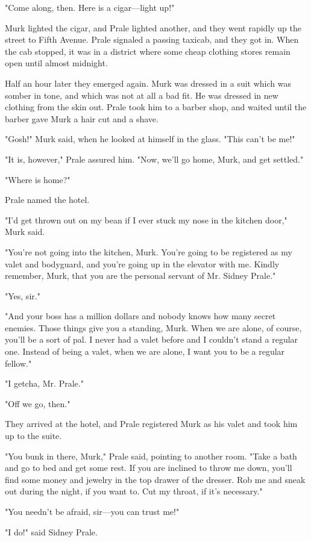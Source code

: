 \documentclass{novel}
\begin{document}
"Come along, then. Here is a cigar---light up!"

Murk lighted the cigar, and Prale lighted another, and they went rapidly up the street to Fifth Avenue. Prale signaled a passing taxicab, and they got in. When the cab stopped, it was in a district where some cheap clothing stores remain open until almost midnight.

Half an hour later they emerged again. Murk was dressed in a suit which was somber in tone, and which was not at all a bad fit. He was dressed in new clothing from the skin out. Prale took him to a barber shop, and waited until the barber gave Murk a hair cut and a shave.

"Gosh!" Murk said, when he looked at himself in the glass. "This can't be me!"

"It is, however," Prale assured him. "Now, we'll go home, Murk, and get settled."

"Where is home?"

Prale named the hotel.

"I'd get thrown out on my bean if I ever stuck my nose in the kitchen door," Murk said.

"You're not going into the kitchen, Murk. You're going to be registered as my valet and bodyguard, and you're going up in the elevator with me. Kindly remember, Murk, that you are the personal servant of Mr. Sidney Prale."

"Yes, sir."

"And your boss has a million dollars and nobody knows how many secret enemies. Those things give you a standing, Murk. When we are alone, of course, you'll be a sort of pal. I never had a valet before and I couldn't stand a regular one. Instead of being a valet, when we are alone, I want you to be a regular fellow."

"I getcha, Mr. Prale."

"Off we go, then."

They arrived at the hotel, and Prale registered Murk as his valet and took him up to the suite.

"You bunk in there, Murk," Prale said, pointing to another room. "Take a bath and go to bed and get some rest. If you are inclined to throw me down, you'll find some money and jewelry in the top drawer of the dresser. Rob me and sneak out during the night, if you want to. Cut my throat, if it's necessary."

"You needn't be afraid, sir---you can trust me!"

"I do!" said Sidney Prale.
\end{document}
